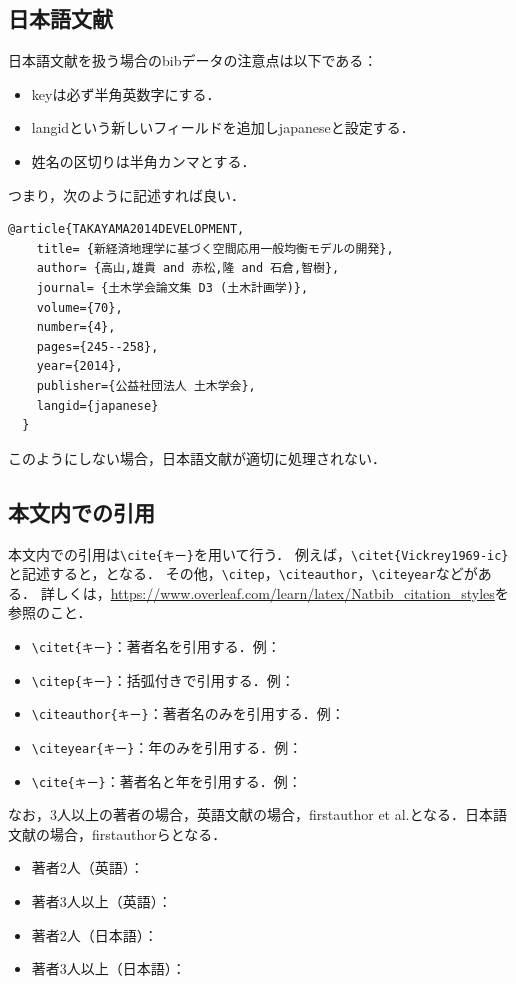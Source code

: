 \documentclass[../main/main]{subfiles}
\begin{document}
\subsection{日本語文献}\label{subsec:japanese_bib}
日本語文献を扱う場合のbibデータの注意点は以下である：
\begin{itemize}
  \item keyは必ず半角英数字にする．
  \item langidという新しいフィールドを追加しjapaneseと設定する．
  \item 姓名の区切りは半角カンマとする．
\end{itemize}
つまり，次のように記述すれば良い．
\begin{framed}
  \begin{lstlisting}[language={[latex]TeX}]
    @article{TAKAYAMA2014DEVELOPMENT,
    title= {新経済地理学に基づく空間応用一般均衡モデルの開発},
    author= {高山,雄貴 and 赤松,隆 and 石倉,智樹},
    journal= {土木学会論文集 D3 (土木計画学)},
    volume={70},
    number={4},
    pages={245--258},
    year={2014},
    publisher={公益社団法人 土木学会},
    langid={japanese}
  }
  \end{lstlisting}
\end{framed}
このようにしない場合，日本語文献が適切に処理されない．

\subsection{本文内での引用}
本文内での引用は\verb|\cite{キー}|を用いて行う．
例えば，\verb|\citet{Vickrey1969-ic}|と記述すると，\citet{Vickrey1969-ic}となる．
その他，\verb|\citep|，\verb|\citeauthor|，\verb|\citeyear|などがある．
詳しくは，\url{https://www.overleaf.com/learn/latex/Natbib\_citation\_styles}を参照のこと．
  \begin{itemize}
    \item \verb|\citet{キー}|：著者名を引用する．例：\citet{Vickrey1969-ic}
    \item \verb|\citep{キー}|：括弧付きで引用する．例：\citep{Vickrey1969-ic}
    \item \verb|\citeauthor{キー}|：著者名のみを引用する．例：\citeauthor{Vickrey1969-ic}
    \item \verb|\citeyear{キー}|：年のみを引用する．例：\citeyear{Vickrey1969-ic}
    \item \verb|\cite{キー}|：著者名と年を引用する．例：\cite{Vickrey1969-ic}
  \end{itemize}
 なお，3人以上の著者の場合，英語文献の場合，firstauthor et al.となる．日本語文献の場合，firstauthorらとなる．
\begin{itemize}
  \item 著者2人（英語）：\citet{arnott2011corridor}
  \item 著者3人以上（英語）：\citet{arnott1990economics}
  \item 著者2人（日本語）：\citet{TAKAYAMA2011SPATIAL}
  \item 著者3人以上（日本語）：\citet{TAKAYAMA2014DEVELOPMENT}
\end{itemize}
\end{document}
